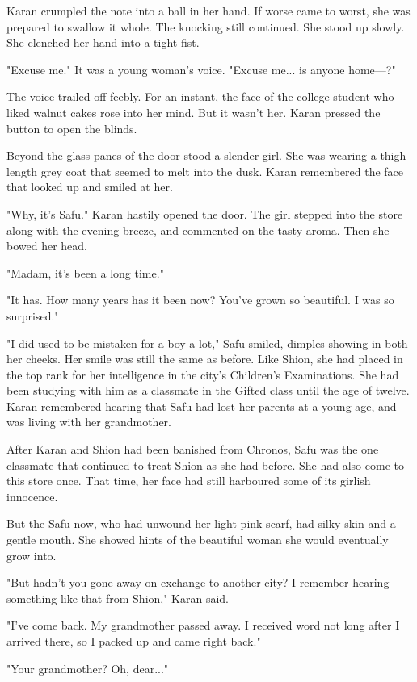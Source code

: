 Karan crumpled the note into a ball in her hand. If worse came to worst,
she was prepared to swallow it whole. The knocking still continued. She
stood up slowly. She clenched her hand into a tight fist.

"Excuse me." It was a young woman's voice. "Excuse me... is anyone
home---?"

The voice trailed off feebly. For an instant, the face of the college
student who liked walnut cakes rose into her mind. But it wasn't her.
Karan pressed the button to open the blinds.

Beyond the glass panes of the door stood a slender girl. She was wearing
a thigh-length grey coat that seemed to melt into the dusk. Karan
remembered the face that looked up and smiled at her.

"Why, it's Safu." Karan hastily opened the door. The girl stepped into
the store along with the evening breeze, and commented on the tasty
aroma. Then she bowed her head.

"Madam, it's been a long time."

"It has. How many years has it been now? You've grown so beautiful. I
was so surprised."

"I did used to be mistaken for a boy a lot," Safu smiled, dimples
showing in both her cheeks. Her smile was still the same as before. Like
Shion, she had placed in the top rank for her intelligence in the city's
Children's Examinations. She had been studying with him as a classmate
in the Gifted class until the age of twelve. Karan remembered hearing
that Safu had lost her parents at a young age, and was living with her
grandmother.

After Karan and Shion had been banished from Chronos, Safu was the one
classmate that continued to treat Shion as she had before. She had also
come to this store once. That time, her face had still harboured some of
its girlish innocence.

But the Safu now, who had unwound her light pink scarf, had silky skin
and a gentle mouth. She showed hints of the beautiful woman she would
eventually grow into.

"But hadn't you gone away on exchange to another city? I remember
hearing something like that from Shion," Karan said.

"I've come back. My grandmother passed away. I received word not long
after I arrived there, so I packed up and came right back."

"Your grandmother? Oh, dear..."

